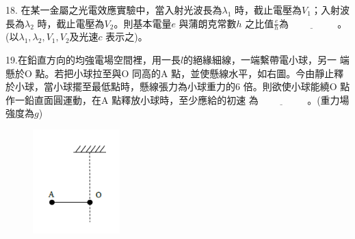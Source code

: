 \documentclass[cn,10pt,math=newtx,chinesefont=founder,device=ig]{elegantbook}
\begin{document}
\newpage

\begin{example}
   18. 在某一金屬之光電效應實驗中，當入射光波長為$\lambda_1$ 時，截止電壓為$V_1$；入射波長為$\lambda_2$ 時，截止電壓為$V_2$。則基本電量$e$ 與蒲朗克常數$h$ 之比值$\frac{e}{h}$為$\underline{\hspace{2cm}}$ 。(以$\lambda_1, \lambda_2, V_1, V_2 及光速c$ 表示之)。\\
    \rightline{[中壢高中教甄109]}
\end{example}
\begin{solution}
    
\end{solution}

\newpage

\begin{example}
   19.在鉛直方向的均強電場空間裡，用一長$l$的絕緣細線，一端繫帶電小球，另一
端懸於O 點。若把小球拉至與O 同高的A 點，並使懸線水平，如右圖。今由靜止釋於小球，當小球擺至最低點時，懸線張力為小球重力的6 倍。則欲使小球能繞O 點作一鉛直面圓運動，在A 點釋放小球時，至少應給的初速
為$\underline{\hspace{2cm}}$ 。(重力場強度為$g$)\\
    \rightline{[中壢高中教甄109]}
\end{example}
\begin{solution}
    
\end{solution}
\begin{figure}[htbp]
    \flushright
    \includegraphics[width=0.3\textwidth]{image/109中壢19.png}
  \end{figure}
\newpage
\end{document}
